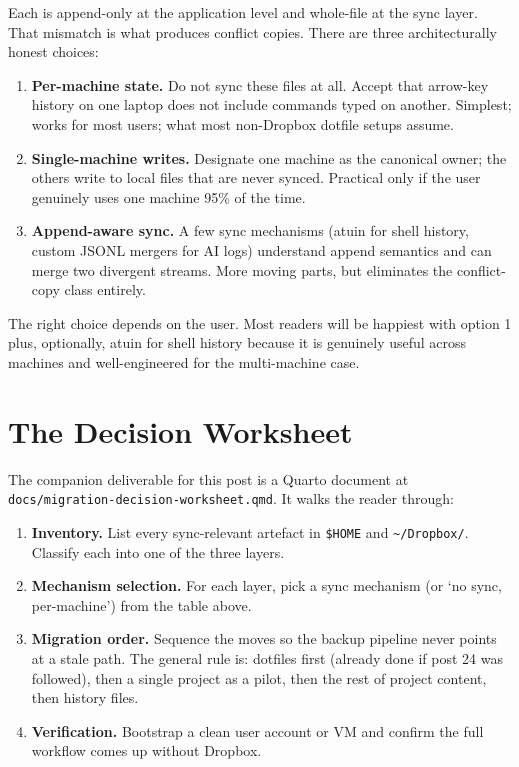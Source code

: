 \documentclass[
  11pt,
  letterpaper,
  DIV=11,
  numbers=noendperiod]{scrartcl}
\providecommand{\tightlist}{%
  \setlength{\itemsep}{0pt}\setlength{\parskip}{0pt}}\usepackage{longtable,booktabs,array}
\begin{document}
Each is append-only at the application level and whole-file at the sync
layer. That mismatch is what produces conflict copies. There are three
architecturally honest choices:

\begin{enumerate}
\def\labelenumi{\arabic{enumi}.}
\tightlist
\item
  \textbf{Per-machine state.} Do not sync these files at all. Accept
  that arrow-key history on one laptop does not include commands typed
  on another. Simplest; works for most users; what most non-Dropbox
  dotfile setups assume.
\item
  \textbf{Single-machine writes.} Designate one machine as the canonical
  owner; the others write to local files that are never synced.
  Practical only if the user genuinely uses one machine 95\% of the
  time.
\item
  \textbf{Append-aware sync.} A few sync mechanisms (atuin for shell
  history, custom JSONL mergers for AI logs) understand append semantics
  and can merge two divergent streams. More moving parts, but eliminates
  the conflict-copy class entirely.
\end{enumerate}

The right choice depends on the user. Most readers will be happiest with
option 1 plus, optionally, atuin for shell history because it is
genuinely useful across machines and well-engineered for the
multi-machine case.

\section{The Decision Worksheet}\label{the-decision-worksheet}

The companion deliverable for this post is a Quarto document at
\texttt{docs/migration-decision-worksheet.qmd}. It walks the reader
through:

\begin{enumerate}
\def\labelenumi{\arabic{enumi}.}
\tightlist
\item
  \textbf{Inventory.} List every sync-relevant artefact in
  \texttt{\$HOME} and \texttt{\textasciitilde{}/Dropbox/}. Classify each
  into one of the three layers.
\item
  \textbf{Mechanism selection.} For each layer, pick a sync mechanism
  (or `no sync, per-machine') from the table above.
\item
  \textbf{Migration order.} Sequence the moves so the backup pipeline
  never points at a stale path. The general rule is: dotfiles first
  (already done if post 24 was followed), then a single project as a
  pilot, then the rest of project content, then history files.
\item
  \textbf{Verification.} Bootstrap a clean user account or VM and
  confirm the full workflow comes up without Dropbox.
\end{enumerate}
\end{document}
